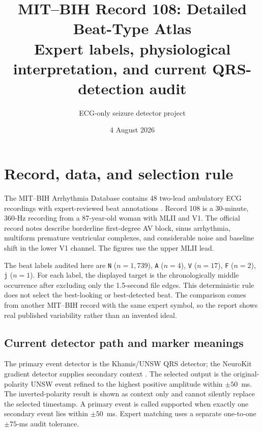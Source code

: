 \documentclass[11pt]{article}
\title{\textbf{MIT--BIH Record 108: Detailed Beat-Type Atlas}\\[0.35em]
        \large Expert labels, physiological interpretation, and current QRS-detection audit}
\author{ECG-only seizure detector project}
\date{4 August 2026}
\begin{document}
        \maketitle

        \begin{center}
        \end{center}

        \section{Record, data, and selection rule}

        The MIT--BIH Arrhythmia Database contains 48 two-lead ambulatory ECG recordings with expert-reviewed
        beat annotations \cite{goldberger2000physiobank,moody2001mitbih,physionetmitdb}. Record 108 is
        a 30-minute, 360-Hz recording from a 87-year-old woman with MLII and V1. The official record notes describe borderline first-degree AV block, sinus arrhythmia, multiform premature ventricular complexes, and considerable noise and baseline shift in the lower V1 channel. The figures use the upper MLII lead.

        The beat labels audited here are \texttt{N} ($n=1,739$), \texttt{A} ($n=4$), \texttt{V} ($n=17$), \texttt{F} ($n=2$), \texttt{j} ($n=1$). For each label, the displayed target is the chronologically
        middle occurrence after excluding only the 1.5-second file edges. This deterministic rule does not
        select the best-looking or best-detected beat. The comparison comes from another MIT--BIH record with
        the same expert symbol, so the report shows real published variability rather than an invented ideal.

        \subsection{Current detector path and marker meanings}

        The primary event detector is the Khamis/UNSW QRS detector; the NeuroKit gradient detector supplies
        secondary context \cite{khamis2016telehealth,makowski2021neurokit,kristof2024qrs}. The selected
        output is the original-polarity UNSW event refined to the highest positive amplitude within $\pm50$~ms.
        The inverted-polarity result is shown as context only and cannot silently replace the selected timestamp.
        A primary event is called supported when exactly one secondary event lies within $\pm50$~ms. Expert
        matching uses a separate one-to-one $\pm75$-ms audit tolerance.
\end{document}
